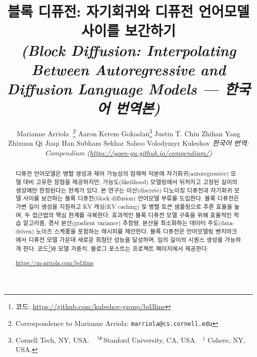 \documentclass{article} %
\title{블록 디퓨전: 자기회귀와 디퓨전 언어모델 사이를 보간하기\\ {\normalsize\emph{(Block Diffusion: Interpolating Between Autoregressive and Diffusion Language Models — 한국어 번역본)}}}
\author{%
  Marianne Arriola\footnotemark[2]$\;\;$\thanks{Correspondence to Marianne Arriola: \texttt{marriola@cs.cornell.edu}} \And
  Aaron Kerem Gokaslan\thanks{Cornell Tech, NY, USA. $\;\;\;^\P$Stanford University, CA, USA.$\;\;\;^\ddag$ Cohere, NY, USA.} \And
  Justin T. Chiu\footnotemark[3] \And
  Zhihan Yang\footnotemark[2] \And
  Zhixuan Qi\footnotemark[2] \And
  Jiaqi Han\footnotemark[5] \And
 Subham Sekhar Sahoo\footnotemark[2] \And
  Volodymyr Kuleshov\footnotemark[2] \AND
  \textit{한국어 번역: Compendium (\url{https://yoon-gu.github.io/compendium/})}
}
\def\algos{BD3-LMs}
\begin{document}
\maketitle

\begin{abstract}
디퓨전 언어모델은 병렬 생성과 제어 가능성의 잠재력 덕분에 자기회귀(autoregressive) 모델 대비 고유한 장점을 제공하지만, 가능도(likelihood) 모델링에서 뒤처지고 고정된 길이의 생성에만 한정된다는 한계가 있다. 본 연구는 이산(discrete) 디노이징 디퓨전과 자기회귀 모델 사이를 보간하는 블록 디퓨전(block diffusion) 언어모델 부류를 도입한다. 블록 디퓨전은 가변 길이 생성을 지원하고 KV 캐싱(KV caching) 및 병렬 토큰 샘플링으로 추론 효율을 높여, 두 접근법의 핵심 한계를 극복한다. 효과적인 블록 디퓨전 모델 구축을 위해 효율적인 학습 알고리즘, 경사 분산(gradient variance) 추정량, 분산을 최소화하는 데이터 주도(data-driven) 노이즈 스케줄을 포함하는 레시피를 제안한다. 블록 디퓨전은 언어모델링 벤치마크에서 디퓨전 모델 가운데 새로운 최첨단 성능을 달성하며, 임의 길이의 시퀀스 생성을 가능하게 한다. 코드\footnote{코드: \href{https://github.com/kuleshov-group/bd3lms}{https://github.com/kuleshov-group/bd3lms}}와 모델 가중치, 블로그 포스트는 프로젝트 페이지에서 제공한다:


\vspace{0.3ex}

\centerline{\href{https://mariannearr.github.io/bd3lms/}{https://m-arriola.com/bd3lms}}
\end{abstract}
\end{document}
